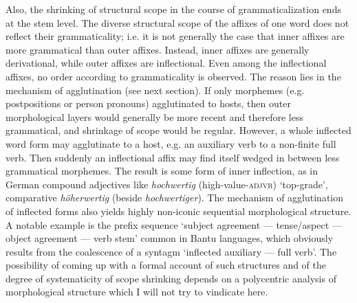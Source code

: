 Also, the shrinking of structural scope in the course of grammaticalization ends at the stem level. The diverse structural scope of the affixes of one word does not reflect their grammaticality; i.e. it is not generally the case that inner affixes are more grammatical than outer affixes. Instead, inner affixes are generally derivational, while outer affixes are inflectional. Even among the inflectional affixes, no order according to grammaticality is observed. The reason lies in the mechanism of agglutination (see next section). If only morphemes (e.g. postpositions or person pronouns) agglutinated to hosts, then outer morphological layers would generally be more recent and therefore less grammatical, and shrinkage of scope would be regular. However, a whole inflected word form may agglutinate to a host, e.g. an auxiliary verb to a non-finite full verb. Then suddenly an inflectional affix may find itself wedged in between less grammatical morphemes. The result is some form of inner inflection, as in German compound adjectives like \textit{hochwertig} (high-value-\textsc{adjvr}) ‘top-grade’, comparative \textit{höherwertig} (beside \textit{hochwertiger}). The mechanism of agglutination of inflected forms also yields highly non-iconic sequential morphological structure. A notable example is the prefix sequence ‘subject agreement — tense/aspect — object agreement — verb stem’ common in Bantu languages, which obviously results from the coalescence of a syntagm ‘inflected auxiliary — full verb’. The possibility of coming up with a formal account of such structures and of the degree of systematicity of scope shrinking depends on a polycentric analysis of morphological structure which I will not try to vindicate here.

